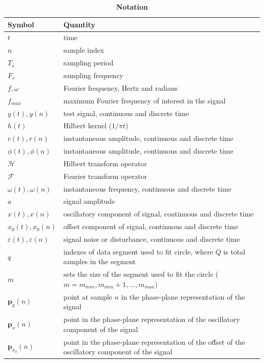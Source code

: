 \documentclass[a4paper]{IEEEtran}
\begin{document}
\begin{table}[!ht]
\caption{
\bf{Notation}}
\begin{tabular}{|l|l|}
	\hline
	\textbf{Symbol} & \textbf{Quantity} \\ \hline
	$t$ & time \\ \hline
	$n$ & sample index \\ \hline
	$T_s$ & sampling period \\ \hline
	$F_s$ & sampling frequency \\ \hline	
	$f,\omega$ & Fourier frequency, Hertz and radians \\ \hline	
	$f_{max}$ & maximum Fourier frequency of interest in the signal \\ \hline
	$y(t),y(n)$ & test signal, continuous and discrete time \\ \hline
	$h(t)$ & Hilbert kernel ($1/\pi t$) \\ \hline
	$r(t), r(n)$ & instantaneous amplitude, continuous and discrete time \\ \hline
	$\phi(t),\phi(n)$ & instantaneous amplitude, continuous and discrete time \\ \hline
	$\mathcal{H}$ & Hilbert transform operator \\ \hline
	$\mathcal{F}$ & Fourier transform operator \\ \hline
	$\omega(t),\omega(n)$ & instantaneous frequency, continuous and discrete time \\ \hline
	$a$ & signal amplitude \\ \hline
	$x(t),x(n)$ & oscillatory component of signal, continuous and discrete time \\ \hline
	$x_0(t),x_0(n)$ & offset component of signal, continuous and discrete time \\ \hline
	$\varepsilon(t),\varepsilon(n)$ & signal noise or disturbance, continuous and discrete time \\ \hline
	$q$ & indexes of data segment used to fit circle, where $Q$ is total samples in the segment  \\ \hline
	$m$ & sets the size of the segment used to fit the circle ($m=m_{min},m_{min}+1,\hdots,m_{max}$) \\ \hline
	$\mathbf{p}_y(n)$ & point at sample $n$ in the phase-plane representation of the signal \\ \hline
	$\mathbf{p}_x(n)$ & point in the phase-plane representation of the oscillatory component of the signal \\ \hline 
	$\mathbf{p}_{x_0}(n)$ & point in the phase-plane representation of the offset of the oscillatory component of the signal \\ \hline  

\end{tabular}
\end{table}
\end{document}
